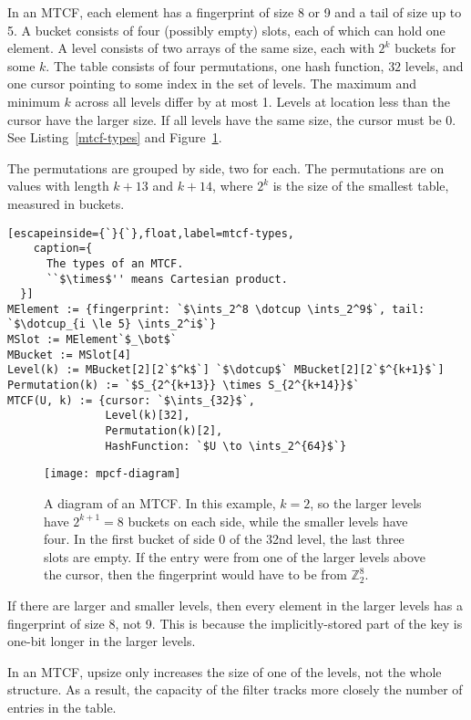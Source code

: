 \documentclass[sigconf, nonacm]{acmart}
\newcommand{\ints}{\mathbb{Z}}
\newcommand{\dotcup}{\ensuremath{\mathaccent\cdot\cup}}
\begin{document}
In an MTCF, each element has a fingerprint of size 8 or 9 and a tail of size up to 5.
A bucket consists of four (possibly empty) slots, each of which can hold one element.
A level consists of two arrays of the same size, each with $2^k$ buckets for some $k$.
The table consists of four permutations, one hash function, $32$ levels, and one cursor pointing to some index in the set of levels.
The maximum and minimum $k$ across all levels differ by at most 1.
Levels at location less than the cursor have the larger size.
If all levels have the same size, the cursor must be 0.
See Listing~\ref{mtcf-types} and Figure~\ref{mtcf-diagram}.

The permutations are grouped by side, two for each.
The permutations are on values with length $k + 13$ and $k + 14$, where $2^k$ is the size of the smallest table, measured in buckets.

\begin{lstlisting}[escapeinside={`}{`},float,label=mtcf-types,
    caption={
      The types of an MTCF.
      ``$\times$'' means Cartesian product.
  }]
MElement := {fingerprint: `$\ints_2^8 \dotcup \ints_2^9$`, tail: `$\dotcup_{i \le 5} \ints_2^i$`}
MSlot := MElement`$_\bot$`
MBucket := MSlot[4]
Level(k) := MBucket[2][2`$^k$`] `$\dotcup$` MBucket[2][2`$^{k+1}$`]
Permutation(k) := `$S_{2^{k+13}} \times S_{2^{k+14}}$`
MTCF(U, k) := {cursor: `$\ints_{32}$`,
               Level(k)[32],
               Permutation(k)[2],
               HashFunction: `$U \to \ints_2^{64}$`}

\end{lstlisting}

\begin{figure}
  \texttt{[image: mpcf-diagram]}
\caption{\label{mtcf-diagram}
A diagram of an MTCF.
In this example, $k = 2$, so the larger levels have $2^{k+1} = 8$ buckets on each side, while the smaller levels have four.
In the first bucket of side 0 of the 32nd level, the last three slots are empty.
If the entry were from one of the larger levels above the cursor, then the fingerprint would have to be from $\ints_2^8$.
}

\end{figure}

If there are larger and smaller levels, then every element in the larger levels has a fingerprint of size 8, not 9.
This is because the implicitly-stored part of the key is one-bit longer in the larger levels.

In an MTCF, upsize only increases the size of one of the levels, not the whole structure.
As a result, the capacity of the filter tracks more closely the number of entries in the table.
\end{document}
